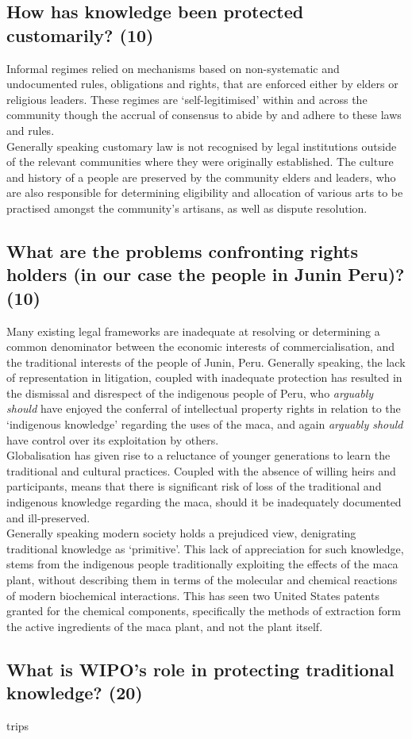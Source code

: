 \documentclass[11pt]{article}
\begin{document}
\subsection{How has knowledge been protected customarily? (10)}
\label{sec:org2d505da}

Informal regimes relied on mechanisms based on non-systematic and undocumented
rules, obligations and rights, that are enforced either by elders or religious
leaders. These regimes are `self-legitimised' within and across the community
though the accrual of consensus to abide by and adhere to these laws and
rules.\\

Generally speaking customary law is not recognised by legal institutions outside
of the relevant communities where they were originally established. The culture
and history of a people are preserved by the community elders and leaders, who
are also responsible for determining eligibility and allocation of various arts
to be practised amongst the community's artisans, as well as dispute resolution.

\subsection{What are the problems confronting rights holders (in our case the people in Junin Peru)? (10)}
\label{sec:org1d42904}

Many existing legal frameworks are inadequate at resolving or determining a
common denominator between the economic interests of commercialisation, and the
traditional interests of the people of Junin, Peru. Generally speaking, the lack
of representation in litigation, coupled with inadequate protection has
resulted in the dismissal and disrespect of the indigenous people of Peru, who
\emph{arguably should} have enjoyed the conferral of intellectual property rights in
relation to the `indigenous knowledge' regarding the uses of the maca, and again
\emph{arguably should} have control over its exploitation by others.\\

Globalisation has given rise to a reluctance of younger generations to learn the
traditional and cultural practices. Coupled with the absence of willing heirs
and participants, means that there is significant risk of loss of the
traditional and indigenous knowledge regarding the maca, should it be
inadequately documented and ill-preserved.\\

Generally speaking modern society holds a prejudiced view, denigrating
traditional knowledge as `primitive'. This lack of appreciation for such
knowledge, stems from the indigenous people traditionally exploiting the effects
of the maca plant, without describing them in terms of the molecular and chemical
reactions of modern biochemical interactions. This has seen two United States
patents granted for the chemical components, specifically the methods of
extraction form the active ingredients of the maca plant, and not the plant
itself.

\subsection{What is WIPO's role in protecting traditional knowledge? (20)}
\label{sec:orgd12277f}
trips
\printbibliography
\end{document}
